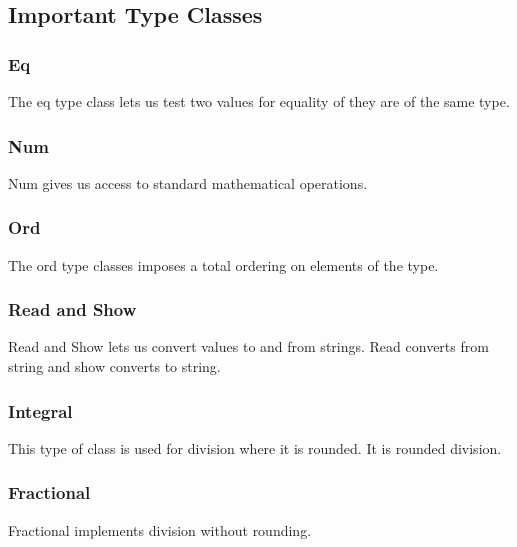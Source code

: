 \documentclass[a4paper]{article}
\theoremstyle{plain}
\theoremstyle{definition}
\theoremstyle{remark}
\begin{document}
\subsection{Important Type Classes}
\subsubsection{Eq}
The eq type class lets us test two values for equality of they are of the same type.
\subsubsection{Num}
Num gives us access to standard mathematical operations.
\subsubsection{Ord}
The ord type classes imposes a total ordering on elements of the type.
\subsubsection{Read and Show}
Read and Show lets us convert values to and from strings. Read converts from string and show converts to string.
\subsubsection{Integral}
This type of class is used for division where it is rounded. It is rounded division.
\subsubsection{Fractional}
Fractional implements division without rounding.
\end{document}
